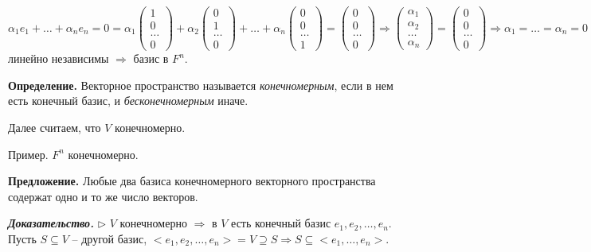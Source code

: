 $\alpha_1 e_1 + \dots + \alpha_n e_n = 0 = \alpha_1 \begin{pmatrix} 1 \\ 0 \\ \dots \\ 0  \end{pmatrix} + \alpha_2 \begin{pmatrix} 0 \\ 1 \\ \dots \\ 0  \end{pmatrix} + \dots + \alpha_n \begin{pmatrix} 0 \\ 0 \\ \dots \\ 1 \end{pmatrix} = \begin{pmatrix} 0 \\ 0 \\ \dots \\ 0  \end{pmatrix} \Rightarrow \begin{pmatrix} \alpha_1 \\ \alpha_2 \\ \dots \\ \alpha_n  \end{pmatrix} = \begin{pmatrix} 0 \\ 0 \\ \dots \\ 0  \end{pmatrix} \Rightarrow \alpha_1 = \dots = \alpha_n = 0 \Rightarrow e_1, \dots, e_n$ линейно независимы $\Rightarrow$ базис в $F^n$.

\bigskip
\textbf{Определение.} Векторное пространство называется \textit{конечномерным}, если в нем есть конечный базис, и \textit{бесконечномерным} иначе.

Далее считаем, что $V$ конечномерно. 

\bigskip
Пример. $F^n$ конечномерно.

\bigskip
\textbf{Предложение.} Любые два базиса конечномерного векторного пространства содержат одно и то же число векторов.

\bigskip
\textbf{\textit{Доказательство.}} $\rhd$ $V$ конечномерно $\Rightarrow$ в $V$ есть конечный базис $e_1, e_2, \dots, e_n$. Пусть $S \subseteq V$ -- другой базис, $<e_1, e_2, \dots, e_n> = V \supseteq S \Rightarrow S \subseteq <e_1, \dots, e_n>$.

